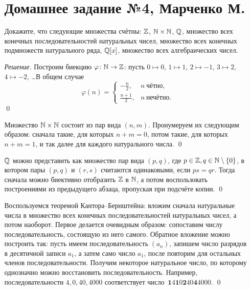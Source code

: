 


    \section*{Домашнее задание №4, Марченко М.}

    \begin{problem}[1]
        Докажите, что следующие множества счётны: \(\mathbb{Z}\), \(\mathbb{N} \times \mathbb{N}\), \(\mathbb{Q}\), множество всех конечных последовательностей натуральных чисел, множество всех конечных подмножеств натурального ряда, \(\mathbb{Q} [x]\), множество всех алгебраических чисел.
    \end{problem}
    \begin{proof}[Решение]
        Построим биекцию \(\varphi \colon \mathbb{N} \to \mathbb{Z}\): пусть \(0 \mapsto 0\), \(1 \mapsto 1\), \(2 \mapsto -1\), \(3 \mapsto 2\), \(4 \mapsto -2\), \ldots В общем случае \[
            \varphi(n) =
            \begin{cases}
                -\frac{n}{2}, & n \ \text{чётно}, \\
                \frac{n+1}{2}, & n \ \text{нечётно}.
            \end{cases}
        \]
        \qed

        Множество \(\mathbb{N} \times \mathbb{N}\) состоит из пар вида \((n, m)\). Пронумеруем их следующим образом: сначала такие, для которых \(n + m = 0\), потом такие, для которых \(n + m = 1\), и так далее для каждого натурального числа. \qed
        
        \(\mathbb{Q}\) можно представить как множество пар вида \((p, q)\), где \(p \in \mathbb{Z}, q \in \mathbb{N} \setminus \{0\}\), в котором пары \((p, q)\) и \((r, s)\) считаются одинаковыми, если \(ps = qr\). Тогда сначала можно биективно отобразить \(\mathbb{Z}\) в \(\mathbb{N}\), а потом воспользовать построениями из предыдущего абзаца, пропуская при подсчёте копии. \qed

        Воспользуемся теоремой Кантора--Бернштейна: вложим сначала натуральные числа в множество всех конечных последовательностей натуральных чисел, а потом наоборот. Первое делается очевидным образом: сопоставим числу последовательность, состоящую из него самого. Обратное вложение можно построить так: пусть имеем последовательность \((a_n)\), запишем число разрядов в десятичной записи \(a_1\), а затем само число \(a_1\), после повторим для остальных членов последовательности. Получим некоторое натуральное число, по которому однозначно можно восстановить последовательность. Например, последовательности \(4, 0, 40, 4000\) соответствует число~\(\textbf{1} 4 \textbf{1} 0 \textbf{2} 40 \textbf{4} 4000\). \qed


\end{proof}
